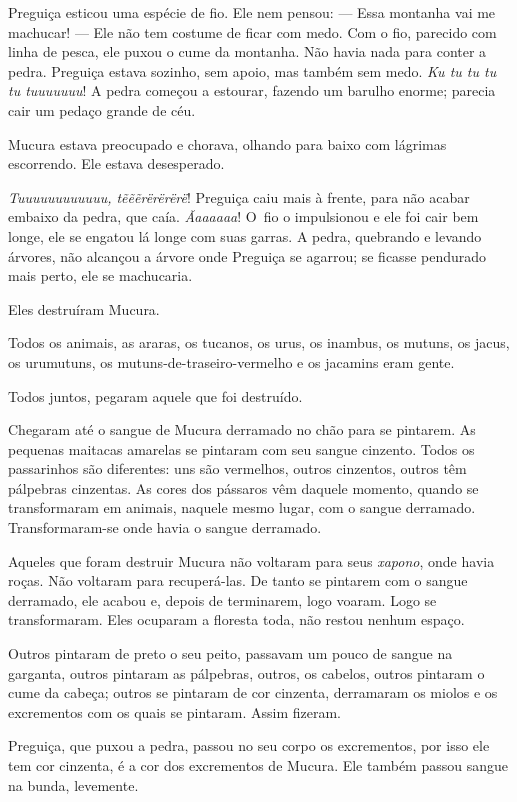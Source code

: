 Preguiça esticou uma espécie de fio. Ele nem pensou: --- Essa montanha vai
me machucar! --- Ele não tem costume de ficar com medo. Com o fio,
parecido com linha de pesca, ele puxou o cume da montanha. Não havia
nada para conter a pedra. Preguiça estava sozinho, sem apoio, mas também
sem medo. \textit{Ku tu tu tu tu tuuuuuuu}! A pedra começou a estourar,
fazendo um barulho enorme; parecia cair um pedaço grande de céu. 

Mucura estava preocupado e chorava, olhando para baixo com lágrimas
escorrendo. Ele estava desesperado. 

\textit{Tuuuuuuuuuuuu, tẽẽẽrërërërë}! Preguiça caiu mais à frente, para
não acabar embaixo da pedra, que caía. \textit{Ãaaaaaa}! O~fio o
impulsionou e ele foi cair bem longe, ele se engatou lá longe com suas
garras. A pedra, quebrando e levando árvores, não alcançou a árvore onde
Preguiça se agarrou; se ficasse pendurado mais perto, ele se
machucaria. 

Eles destruíram Mucura. 

Todos os animais, as araras, os tucanos, os urus, os inambus, os mutuns,
os jacus, os urumutuns, os mutuns-de-traseiro-vermelho e os jacamins
eram gente. 

Todos juntos, pegaram aquele que foi destruído. 

Chegaram até o sangue de Mucura derramado no chão para se pintarem. As
pequenas maitacas amarelas se pintaram com seu sangue cinzento. Todos os
passarinhos são diferentes: uns são vermelhos, outros cinzentos, outros
têm pálpebras cinzentas. As cores dos pássaros vêm daquele momento,
quando se transformaram em animais, naquele mesmo lugar, com o sangue
derramado. Transformaram-se onde havia o sangue derramado.

Aqueles que foram destruir Mucura não voltaram para seus \textit{xapono}, onde
havia roças. Não voltaram para recuperá-las. De tanto se pintarem com o
sangue derramado, ele acabou e, depois de terminarem, logo voaram. Logo
se transformaram. Eles ocuparam a floresta toda, não restou nenhum
espaço. 

Outros pintaram de preto o seu peito, passavam um pouco de sangue na
 garganta, outros pintaram as pálpebras, outros, os cabelos, outros
 pintaram o cume da cabeça; outros se pintaram de cor cinzenta,
 derramaram os miolos e os excrementos com os quais se pintaram. Assim
 fizeram.

Preguiça, que puxou a pedra, passou no seu corpo os excrementos, por
 isso ele tem cor cinzenta, é a cor dos excrementos de Mucura. Ele também
 passou sangue na bunda, levemente.

